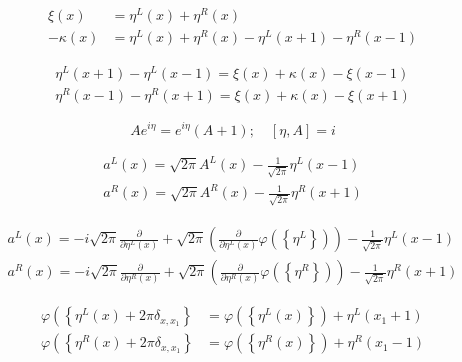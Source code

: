 \documentclass[main.tex]{subfiles}
\begin{document}
\begin{equation}\label{17.51}
	\begin{aligned} \xi(x) &=\eta^{L}(x)+\eta^{R}(x) \\-\kappa(x) &=\eta^{L}(x)+\eta^{R}(x)-\eta^{L}(x+1)-\eta^{R}(x-1) \end{aligned}
\end{equation}



\begin{equation}\label{17.52}
	\begin{array}{l}{\eta^{L}(x+1)-\eta^{L}(x-1)=\xi(x)+\kappa(x)-\xi(x-1)} \\ {\eta^{R}(x-1)-\eta^{R}(x+1)=\xi(x)+\kappa(x)-\xi(x+1)}\end{array}
\end{equation}



\begin{equation}\label{17.53}
	A e^{i \eta}=e^{i \eta}(A+1) ; \quad[\eta, A]=i
\end{equation}



\begin{equation}\label{17.54}
	\begin{array}{l}{a^{L}(x)=\sqrt{2 \pi} A^{L}(x)-\frac{1}{\sqrt{2 \pi}} \eta^{L}(x-1)} \\ {a^{R}(x)=\sqrt{2 \pi} A^{R}(x)-\frac{1}{\sqrt{2 \pi}} \eta^{R}(x+1)}\end{array}
\end{equation}



\begin{equation}\label{17.56}
	\begin{array}{l}{a^{L}(x)=-i \sqrt{2 \pi} \frac{\partial}{\partial \eta^{L}(x)}+\sqrt{2 \pi}\left(\frac{\partial}{\partial \eta^{L}(x)} \varphi\left(\left\{\eta^{L}\right\}\right)\right)-\frac{1}{\sqrt{2 \pi}} \eta^{L}(x-1)} \\ {a^{R}(x)=-i \sqrt{2 \pi} \frac{\partial}{\partial \eta^{R}(x)}+\sqrt{2 \pi}\left(\frac{\partial}{\partial \eta^{R}(x)} \varphi\left(\left\{\eta^{R}\right\}\right)\right)-\frac{1}{\sqrt{2 \pi}} \eta^{R}(x+1)}\end{array}
\end{equation}



\begin{equation}\label{17.58}
	\begin{aligned} \varphi\left(\left\{\eta^{L}(x)+2 \pi \delta_{x, x_{1}}\right\}\right.&=\varphi\left(\left\{\eta^{L}(x)\right\}\right)+\eta^{L}\left(x_{1}+1\right) \\ \varphi\left(\left\{\eta^{R}(x)+2 \pi \delta_{x, x_{1}}\right\}\right.&=\varphi\left(\left\{\eta^{R}(x)\right\}\right)+\eta^{R}\left(x_{1}-1\right) \end{aligned}
\end{equation}
\end{document}
